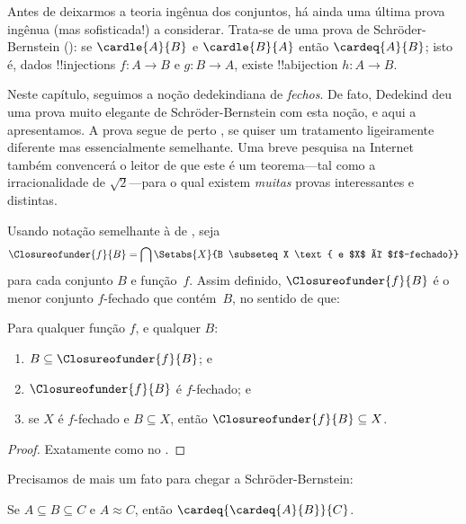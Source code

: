 \documentclass[../../../include/open-logic-section]{subfiles}
\begin{document}


Antes de deixarmos a teoria ingênua dos conjuntos, há ainda uma última
prova ingênua (mas sofisticada!) a considerar. Trata-se de uma prova de
Schr\"oder-Bernstein (): se
$\cardle{A}{B}$ e $\cardle{B}{A}$ então $\cardeq{A}{B}$; isto é, dados
!!{injection}s $f \colon A \to B$ e $g \colon B \to A$, existe
!!a{bijection} $h \colon A \to B$.

Neste capítulo, seguimos a noção dedekindiana de \emph{fechos}. De
fato, Dedekind deu uma prova muito elegante de Schr\"oder-Bernstein com
esta noção, e aqui a apresentamos. A prova segue de perto
\citet[pp.~157--8]{Potter2004}, se quiser um tratamento ligeiramente
diferente mas essencialmente semelhante. Uma breve pesquisa na Internet
também convencerá o leitor de que este é um teorema---tal como a
irracionalidade de $\sqrt{2}$---para o qual existem \emph{muitas}
provas interessantes e distintas.

Usando notação semelhante à de ,
seja
\[
\Closureofunder{f}{B} = \bigcap \Setabs{X}{B \subseteq X 
\text{ e $X$ é $f$-fechado}}
\]
para cada conjunto $B$ e função~$f$. Assim definido,
$\Closureofunder{f}{B}$ é o menor conjunto $f$-fechado que contém~$B$,
no sentido de que:

\begin{lem}
	Para qualquer função $f$, e qualquer $B$:
	\begin{enumerate}
		\item{} $B \subseteq \Closureofunder{f}{B}$; e
		\item{} $\Closureofunder{f}{B}$ é $f$-fechado; e
		\item{} se $X$ é $f$-fechado e $B
		\subseteq X$, então $\Closureofunder{f}{B} \subseteq X$.
	\end{enumerate}
\end{lem}

\begin{proof}
Exatamente como no .
\end{proof}

Precisamos de mais um fato para chegar a Schr\"oder-Bernstein:

\begin{prop}
Se $A \subseteq B \subseteq C$ e $A \approx C$, então $\cardeq{\cardeq{A}{B}}{C}$.
\end{prop}
\end{document}
